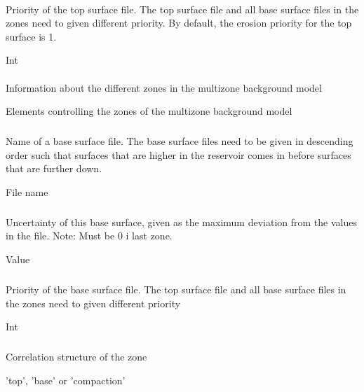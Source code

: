 \paragraph{}
 \slist
   \item \Description Priority of the top surface file. The top surface file and all base surface files in the zones need to given different priority. By default, the erosion priority for the top surface is 1.
   \item \Argument Int
   \item {}
 \elist

\paragraph{}
 \slist
   \item \Description Information about the different zones in the multizone background model
   \item \Argument Elements controlling the zones of the multizone background model
   \item \Default
 \elist

\subparagraph{}
 \slist
   \item \Description Name of a base surface file. The base surface files need to be given in descending order such that surfaces that are higher in the reservoir comes in before surfaces that are further down.
   \item \Argument File name
   \item \Default
 \elist

\subparagraph{}
 \slist
   \item \Description Uncertainty of this base surface, given as the maximum deviation from the values in the file. Note: Must be 0 i last zone.
   \item \Argument Value
 \elist

\subparagraph{}
 \slist
   \item \Description Priority of the base surface file. The top surface file and all base surface files in the zones need to given different priority
   \item \Argument Int
   \item \Default
 \elist

\subparagraph{}
 \slist
   \item \Description Correlation structure of the zone
   \item \Argument 'top', 'base' or 'compaction'
   \item \Default
 \elist

